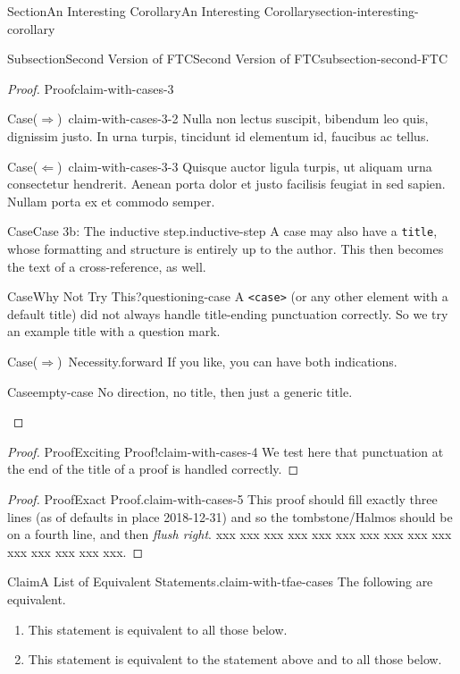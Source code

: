 \documentclass[twoside,10pt,]{article}
\newcommand{\mono}[1]{\texttt{#1}}
\DeclareRobustCommand{\acronymintitle}[1]{\texorpdfstring{#1}{#1}}
\numberwithin{equation}{section}
\begin{document}
\begin{sectionptx}{Section}{An Interesting Corollary}{}{An Interesting Corollary}{}{}{section-interesting-corollary}
\begin{subsectionptx}{Subsection}{Second Version of \acronymintitle{FTC}}{}{Second Version of \acronymintitle{FTC}}{}{}{subsection-second-FTC}
\begin{proof}{Proof}{}{claim-with-cases-3}
\begin{case}{Case}{($\Rightarrow$) }{}{claim-with-cases-3-2}
Nulla non lectus suscipit, bibendum leo quis, dignissim justo. In urna turpis, tincidunt id elementum id, faucibus ac tellus.%
\end{case}
\begin{case}{Case}{($\Leftarrow$) }{}{claim-with-cases-3-3}
Quisque auctor ligula turpis, ut aliquam urna consectetur hendrerit. Aenean porta dolor et justo facilisis feugiat in sed sapien. Nullam porta ex et commodo semper.%
\end{case}
\begin{case}{Case}{}{Case 3b: The inductive step.}{inductive-step}
A case may also have a \mono{title}, whose formatting and structure is entirely up to the author.  This then becomes the text of a cross-reference, as well.%
\end{case}
\begin{case}{Case}{}{Why Not Try This?}{questioning-case}
A \mono{<case>} (or any other element with a default title) did not always handle title-ending punctuation correctly.  So we try an example title with a question mark.%
\end{case}
\begin{case}{Case}{($\Rightarrow$) }{Necessity.}{forward}
If you like, you can have both indications.%
\end{case}
\begin{case}{Case}{}{}{empty-case}
No direction, no title, then just a generic title.%
\end{case}
\end{proof}
\begin{proof}{Proof}{Exciting Proof!}{claim-with-cases-4}
We test here that punctuation at the end of the title of a proof is handled correctly.%
\end{proof}
\begin{proof}{Proof}{Exact Proof.}{claim-with-cases-5}
This proof should fill exactly three lines (as of defaults in place 2018-12-31) and so the tombstone\slash{}Halmos should be on a fourth line, and then \emph{flush right}. xxx xxx xxx xxx xxx xxx xxx xxx xxx xxx xxx xxx xxx xxx xxx.%
\end{proof}
\begin{claim}{Claim}{A List of Equivalent Statements.}{}{claim-with-tfae-cases}%
The following are equivalent.%
\begin{enumerate}[label={(\roman*)}]
\item{}This statement is equivalent to all those below.%
\item{}This statement is equivalent to the statement above and to all those below.%

\end{enumerate}
\end{claim}
\end{subsectionptx}
\end{sectionptx}
\end{document}
